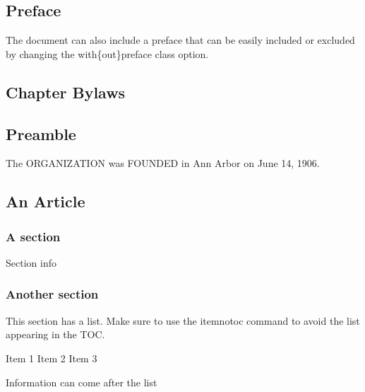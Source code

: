\documentclass[bylaws,final,10pt,withoptional,withpreface]{bylaws}
\begin{document}
\frontmatter
\maketitle
\setcounter{tocdepth}{2} %
\tableofcontents
\newpage
\mainmatter

\begin{preface}
\chapter*{Preface}
The document can also include a preface that can be easily included or excluded by changing the with\{out\}preface class option.
\end{preface}
\begin{optionalpart}
\part{Chapter Bylaws}%
\end{optionalpart}
\chapter*{Preamble}
The ORGANIZATION was FOUNDED in Ann Arbor on June 14, 1906. 

\chapter{An Article}

\section{A section}
Section info


\section{Another section}This section has a list. Make sure to use the itemnotoc command to avoid the list appearing in the TOC.

\begin{compactenum}[1.]
\itemnotoc  Item 1
\itemnotoc  Item 2
\itemnotoc Item 3
\end{compactenum}
Information can come after the list
\end{document}
